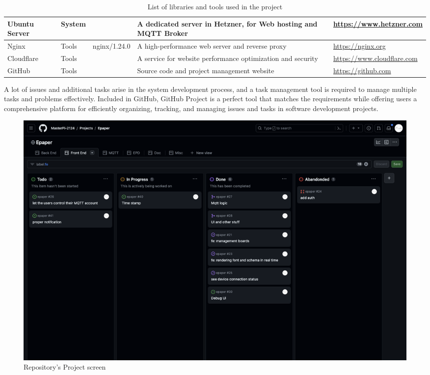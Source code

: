 \documentclass[../Main.tex]{subfiles}
\begin{document}
\begin{table}[H]
\begin{tabular}{| m{3cm} | m{1cm} | m{1.4cm} | m{4cm} | m{4cm} |}
        Ubuntu Server                           & System        &                   & A dedicated server in Hetzner, for Web hosting and MQTT Broker    & \url{https://www.hetzner.com}                                     \\ \hline
        Nginx                                   & Tools         & nginx/1.24.0      & A high-performance web server and reverse proxy                   & \url{https://nginx.org}                                           \\ \hline
        Cloudflare                              & Tools         &                   & A service for website performance optimization and security       & \url{https://www.cloudflare.com}                                  \\ \hline
        GitHub                                  & Tools         &                   & Source code and project management website                        & \url{https://github.com}                      \\ \hline
    \end{tabular}
    \caption{List of libraries and tools used in the project}
    \label{fig:table_tools}
\end{table}

A lot of issues and additional tasks arise in the system development process, and a task management tool is required to manage multiple tasks and problems effectively. Included in GitHub, GitHub Project is a perfect tool that matches the requirements while offering users a comprehensive platform for efficiently organizing, tracking, and managing issues and tasks in software development projects.
\begin{figure}[H]
    \centering
    \includegraphics[width=0.8\linewidth]{doc//imgs/github-projects.png}
    \caption{Repository's Project screen}
    \label{fig:enter-label}
\end{figure}
\end{document}
